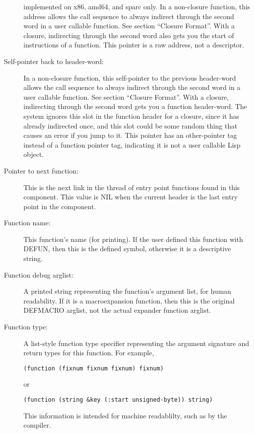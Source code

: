 \begin{description}
     implemented on x86, amd64, and sparc only. In a non-closure
     function, this address allows the call sequence to always
     indirect through the second word in a user callable function.
     See section ``Closure Format''.  With a closure, indirecting
     through the second word also gets you the start of instructions
     of a function.  This pointer is a raw address, not a descriptor.
   \item[Self-pointer back to header-word:]
      In a non-closure function, this self-pointer to the previous header-word
      allows the call sequence to always indirect through the second word in a
      user callable function.  See section ``Closure Format''.  With a closure,
      indirecting through the second word gets you a function header-word.  The
      system ignores this slot in the function header for a closure, since it
      has already indirected once, and this slot could be some random thing
      that causes an error if you jump to it.  This pointer has an
      other-pointer tag instead of a function pointer tag, indicating it is not
      a user callable Lisp object.
   \item[Pointer to next function:]
      This is the next link in the thread of entry point functions found in
      this component.  This value is NIL when the current header is the last
      entry point in the component.
   \item[Function name:]
      This function's name (for printing).  If the user defined this function
      with DEFUN, then this is the defined symbol, otherwise it is a
      descriptive string.
   \item[Function debug arglist:]
      A printed string representing the function's argument list, for human
      readability.  If it is a macroexpansion function, then this is the
      original DEFMACRO arglist, not the actual expander function arglist.
   \item[Function type:]
      A list-style function type specifier representing the argument signature
      and return types for this function.  For example,
      \begin{verbatim}
(function (fixnum fixnum fixnum) fixnum)
      \end{verbatim}
      or
      \begin{verbatim}
(function (string &key (:start unsigned-byte)) string)
      \end{verbatim}
      This information is intended for machine readablilty, such as by the
      compiler.
\end{description}

